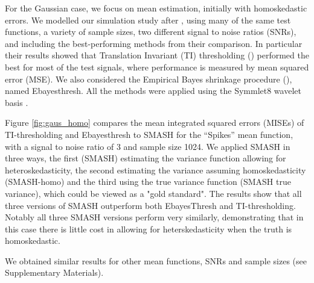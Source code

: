 \documentclass[12pt]{article}
\begin{document}
For the Gaussian case, we focus on mean estimation, initially with homoskedastic errors. We modelled our simulation study after
\cite{Antoniadis2001Wavelet}, using many of the same test functions, a variety of sample sizes, two different signal to noise ratios (SNRs), and including
the best-performing methods from their comparison. In particular their results showed that Translation Invariant (TI) thresholding (\cite{Coifman1995Translationinvariant}) performed the best for most of the test signals, where performance is measured by mean squared error (MSE). We also considered the Empirical Bayes shrinkage procedure (\cite{Johnstone2005Empirical}), named Ebayesthresh. 
All the methods were applied using the Symmlet8 wavelet basis \cite{Daubechies1992Ten}.

Figure \ref{fig:gaus_homo} compares the mean integrated squared errors (MISEs) of TI-thresholding and Ebayesthresh to SMASH for the ``Spikes'' mean function, with a signal to noise ratio of 3 and sample size 1024. We applied SMASH in three ways, the first (SMASH) estimating the variance function allowing for heteroskedasticity, the second estimating the variance assuming homoskedasticity (SMASH-homo) and the
third using the true variance function (SMASH true variance), which could be viewed as a "gold standard". The results show that all three versions of SMASH outperform both EbayesThresh and TI-thresholding. Notably all three SMASH versions perform very similarly, demonstrating that
in this case there is little cost in allowing for heterskedasticity when the truth is homoskedastic.

We obtained similar results for other mean functions, SNRs and sample sizes (see Supplementary Materials).
\end{document}
